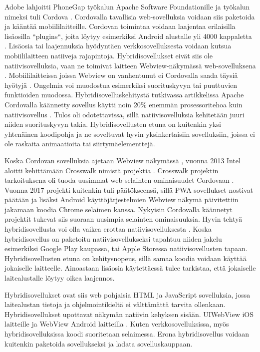 \documentclass{tktltiki}
\begin{document}
Adobe lahjoitti PhoneGap työkalun Apache Software Foundationille ja työkalun nimeksi tuli Cordova \cite{Tung}. Cordovalla tavallisia web-sovelluksia voidaan siis paketoida ja kääntää mobiililaitteille. Cordovan toimintaa voidaan laajentaa erilaisilla lisäosilla “plugins“, joita löytyy esimerkiksi Android alustalle yli 4000 kappaletta \cite{Cordova}. Lisäosia tai laajennuksia hyödyntäen verkkosovelluksesta voidaan kutsua mobiililaitteen natiiveja rajapintoja. Hybridisovellukset eivät siis ole natiivisovelluksia, vaan ne toimivat laitteen Webview-näkymässä web-sovelluksena \cite{bosnic2016development}. Mobiililaitteissa joissa Webview on vanhentunut ei Cordovalla saada täysiä hyötyjä \cite{bosnic2016development}. Ongelmia voi muodostua esimerkiksi suorituskyvyn tai puuttuvien funktioiden muodossa. Hybridisovelluskehitystä tutkivassa artikkelissa Apache Cordovalla käännetty sovellus käytti noin 20\% enemmän prosessoritehoa kuin natiivisovellus \cite{bosnic2016development}. Tulos oli odotettavissa, sillä natiivisovelluksia kehitetään juuri niiden suorituskyvyn takia. Hybridisovellusten etuna on kuitenkin yksi yhtenäinen koodipohja ja ne soveltuvat hyvin yksinkertaisiin sovelluksiin, joissa ei ole raskaita animaatioita tai siirtymäelementtejä. 

Koska Cordovan sovelluksia ajetaan Webview näkymässä \cite{bosnic2016development}, vuonna 2013 Intel aloitti kehittämään Crosswalk nimistä projektia \cite{Crosswalk}. Crosswalk projektin tarkoituksena oli tuoda uusimmat web-selainten ominaisuudet Cordovaan \cite{bosnic2016development}. Vuonna 2017 projekti kuitenkin tuli päätökseensä, sillä PWA sovellukset nostivat päätään ja lisäksi Android käyttöjärjestelmien Webview näkymä päivitettiin jakamaan koodia Chrome selaimen kanssa. Nykyisin Cordovalla käännetyt projektit tukevat siis suoraan uusimpia selainten ominaisuuksia. Hyvin tehtyä hybridisovellusta voi olla vaikea erottaa natiivisovelluksesta \cite{Haikonen}. Koska hybridisovellus on paketoitu natiivisovellukseksi tapahtuu niiden jakelu  esimerkiksi Google Play kaupassa, tai Apple Storessa natiivisovellusten tapaan. Hybridisovellusten etuna on kehitysnopeus, sillä samaa koodia voidaan käyttää jokaiselle laitteelle. Ainoastaan lisäosia käytettäessä tulee tarkistaa, että jokaiselle laitealustalle löytyy oikea laajennos. 

Hybridisovellukset ovat siis web pohjaisia HTML ja JavaScript sovelluksia, jossa laitealustan tietoja ja ohjelmointikieltä ei välttämättä tarvita ollenkaan. Hybridisovellukset upottavat näkymän natiivin kehyksen sisään. UIWebView iOS laitteille ja WebView Android laitteilla \cite{xanthopoulos2013comparative}. Kuten verkkosovelluksissa, myös hybridisovelluksissa koodi suoritetaan selaimessa. Erona hybridisovellus voidaan kuitenkin paketoida sovellukseksi ja ladata sovelluskauppaan. 
\end{document}
